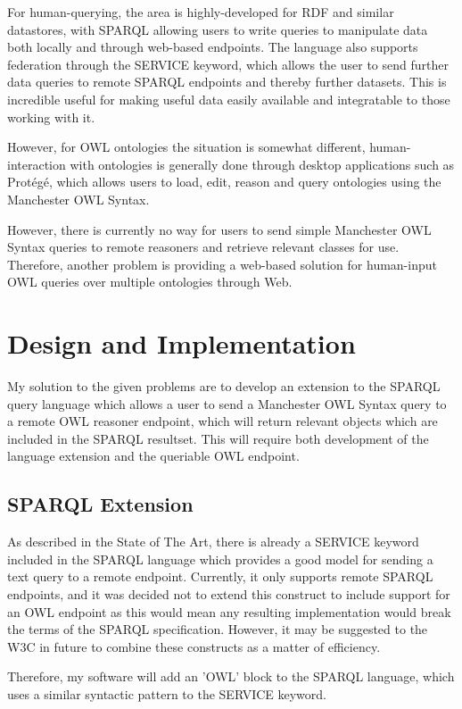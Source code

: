 \documentclass{article}
\begin{document}
For human-querying, the area is highly-developed for RDF and similar datastores, 
with SPARQL allowing users to write queries to manipulate data both locally and
through web-based endpoints. The language also supports federation through the
SERVICE keyword, which allows the user to send further data queries to remote
SPARQL endpoints and thereby further datasets. This is incredible useful for
making useful data easily available and integratable to those working with it.

However, for OWL ontologies the situation is somewhat different,
human-interaction with ontologies is generally done through desktop applications
such as Protégé, which allows users to load, edit, reason and query ontologies 
using the Manchester OWL Syntax.

However, there is currently no way for users to send simple Manchester OWL
Syntax queries to remote reasoners and retrieve relevant classes for use. 
Therefore, another problem is providing a web-based solution for human-input OWL
queries over multiple ontologies through Web. 

\section{Design and Implementation}

My solution to the given problems are to develop an extension to the SPARQL
query language which allows a user to send a Manchester OWL Syntax query to a
remote OWL reasoner endpoint, which will return relevant objects which are
included in the SPARQL resultset. This will require both development of the
language extension and the queriable OWL endpoint.

\subsection{SPARQL Extension}

As described in the State of The Art, there is already a SERVICE keyword
included in the SPARQL language which provides a good model for sending a text
query to a remote endpoint. Currently, it only supports remote SPARQL endpoints,
and it was decided not to extend this construct to include support for an OWL
endpoint as this would mean any resulting implementation would break the terms
of the SPARQL specification. However, it may be suggested to the W3C in future
to combine these constructs as a matter of efficiency. 

Therefore, my software will add an 'OWL' block to the SPARQL language, which
uses a similar syntactic pattern to the SERVICE keyword.
\end{document}
